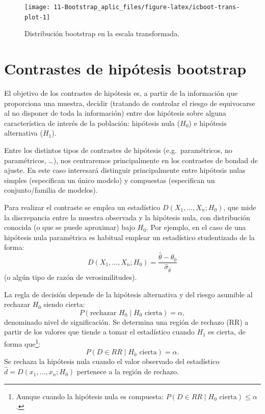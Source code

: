 \documentclass[
]{book}
\theoremstyle{break}
\theoremstyle{nonumberplain}
\begin{document}
\begin{figure}[!htb]

{\centering \texttt{[image: 11-Bootstrap\_aplic\_files/figure-latex/icboot-trans-plot-1]} 

}

\caption{Distribución bootstrap en la escala transformada.}\label{fig:icboot-trans-plot}
\end{figure}

\hypertarget{boot-test}{%
\section{Contrastes de hipótesis bootstrap}\label{boot-test}}

El objetivo de los contrastes de hipótesis es, a partir de la información
que proporciona una muestra, decidir (tratando de controlar el riesgo de
equivocarse al no disponer de toda la información)
entre dos hipótesis sobre alguna característica de interés de la población:
hipótesis nula (\(H_{0}\)) e hipótesis alternativa (\(H_{1}\)).

Entre los distintos tipos de contrastes de hipótesis (e.g.~paramétricos,
no paramétricos, \ldots), nos centraremos principalmente en los contrastes
de bondad de ajuste. En este caso interesará distinguir principalmente
entre hipótesis nulas simples (especifican un único modelo) y compuestas
(especifican un conjunto/familia de modelos).

Para realizar el contraste se emplea un estadístico \(D\left( X_1,\ldots ,X_n;H_0\right)\),
que mide la discrepancia entre la muestra observada y la hipótesis nula,
con distribución conocida (o que se puede aproximar) bajo \(H_0\).
Por ejemplo, en el caso de una hipótesis nula paramétrica
es habitual emplear un estadístico studentizado de la forma:
\[D\left( X_1,\ldots ,X_n;H_0\right) =
\frac{\hat{\theta}-\theta _0}{\hat\sigma_{\hat\theta}}\]
(o algún tipo de razón de verosimilitudes).

La regla de decisión depende de la hipótesis alternativa y
del riesgo asumible al rechazar \(H_0\) siendo cierta:
\[P\left( \text{rechazar }H_0\mid H_0\text{ cierta}\right) =\alpha,\]
denominado nivel de significación.
Se determina una región de rechazo (RR) a partir de los valores que tiende
a tomar el estadístico cuando \(H_1\) es cierta,
de forma que\footnote{Aunque cuando la hipótesis nula es compuesta:
  \(P\left( D\in RR \mid H_0\text{ cierta}\right) \leq \alpha\).}:
\[P\left( D\in RR \mid H_0\text{ cierta}\right) =\alpha.\]
Se rechaza la hipótesis nula cuando el valor observado del
estadístico \(\hat{d}=D\left( x_1,\ldots ,x_n;H_0\right)\) pertenece
a la región de rechazo.
\end{document}
